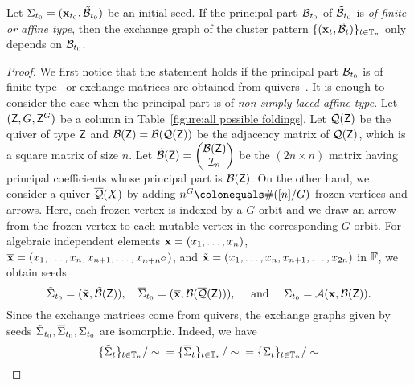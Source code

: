 \begin{theorem}\label{thm_exchange_graph_Dynkin}
Let $\Sigma_{t_0} = (\mathbf x_{t_0}, \mathcal{\tilde{B}}_{t_0})$ be an initial seed.
If the principal part~$\mathcal{B}_{t_0}$ of $\mathcal{\tilde{B}}_{t_0}$ is \emph{of finite or affine type},  then the exchange graph of the cluster pattern $\{(\mathbf{x}_t, \mathcal{\tilde{B}}_t)\}_{t \in \mathbb T_n}$ only depends on $\mathcal{B}_{t_0}$.
\end{theorem}
\begin{proof}
We first notice that the statement holds if the principal part $\mathcal{B}_{t_0}$ is of finite type~\cite[Theorem~1.13]{FZ2_2003} or exchange matrices are obtained from quivers~\cite[Theorem~4.6]{IKLP13}. 
It is enough to consider the case when the principal part is of \emph{non-simply-laced affine type}. 
Let $(\mathsf{Z}, G, {\mathsf{Z}^G})$ be a column in Table~\ref{figure:all 
possible foldings}.
Let $\mathcal{Q}(\mathsf{Z})$ be the quiver of type $\mathsf{Z}$ and $\mathcal{B}(\mathsf{Z})=\mathcal{B}(\mathcal{Q}(\mathsf{Z}))$ be the adjacency matrix of $\mathcal{Q}(\mathsf{Z})$, which is a square matrix of size $n$.
Let $\mathcal{\tilde{B}}(\mathsf{Z}) = \begin{pmatrix}
\mathcal{B}(\mathsf{Z})\\ \mathcal{I}_n
\end{pmatrix}$ be the $(2n\times n)$ matrix having principal coefficients whose principal part is $\mathcal{B}(\mathsf{Z})$. 
On the other hand, we consider a quiver $\overline{\mathcal{Q}}(X)$ by adding $n^G \colonequals \#([n]/G)$ frozen vertices and arrows. Here, each frozen vertex is indexed by a $G$-orbit and we draw an arrow from the frozen vertex to each mutable vertex in the corresponding $G$-orbit. 
For algebraic independent elements $\mathbf{x}=(x_1,\dots, x_n)$, $\overline{\mathbf{x}} = (x_1,\dots,x_n,x_{n+1},\dots,x_{n+n^G})$, and $\tilde{\mathbf{x}}=(x_1,\dots, x_n, x_{n+1},\dots, x_{2n})$ in $\mathbb{F}$, we obtain seeds
\[
\tilde{\Sigma}_{t_0} = (\tilde{\mathbf{x}}, \mathcal{\tilde{B}}(\mathsf{Z})),
\quad 
\overline{\Sigma}_{t_0} = (\overline{\mathbf{x}}, \mathcal{B}(\overline{\mathcal{Q}}(\mathsf{Z}))), 
\quad\text{ and }\quad
\Sigma_{t_0} = \mathcal{A}(\mathbf{x},\mathcal{B}(\mathsf{Z})).
\]
Since the exchange matrices come from quivers, the exchange graphs given by seeds $\tilde{\Sigma}_{t_0}, \overline{\Sigma}_{t_0}, \Sigma_{t_0}$ are isomorphic. Indeed, we have
\begin{equation}\label{equation_exchange_graphs_are_the_same}
\{ \tilde{\Sigma}_{t}\}_{t \in \mathbb T_n}/\sim \;\; = 
\{ \overline{\Sigma}_{t}\}_{t \in \mathbb T_n}/\sim \;\;  =   
\{ {\Sigma}_{t}\}_{t \in \mathbb T_n}/\sim 
\end{equation}


\end{proof}
